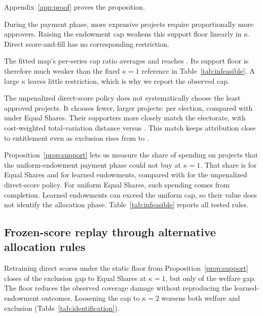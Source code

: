 \documentclass{article}
\begin{document}
Appendix~\ref{app:proof} proves the proposition.

During the payment phase, more expensive projects require proportionally more
approvers. Raising the endowment cap weakens this support floor linearly in
$\kappa$. Direct score-and-fill has no corresponding restriction.

The fitted map's per-series cap ratio averages \KappaEndowMean{} and reaches
\KappaEndowMax{}. Its support floor is therefore much weaker than the fixed
$\kappa = 1$ reference in Table~\ref{tab:infeasible}. A large $\kappa$ leaves
little restriction, which is why we report the observed cap.

The unpenalized direct-score policy does not systematically choose the least
approved projects. It chooses fewer, larger projects:
\CompOutcomeCornerFunded{} per election, compared with \CompMESFunded{} under
Equal Shares. Their supporters more closely match the electorate, with
cost-weighted total-variation distance \CompOutcomeCornerRepTV{} versus
\CompMESRepTV{}. This match keeps attribution close to entitlement even as
exclusion rises from \TestMESExcl{} to \LearnedCornerExcl{}.

Proposition~\ref{prop:support} lets us measure the share of spending on projects
that the uniform-endowment payment phase could not buy at $\kappa = 1$. That share is
\InfeasMESBudget{} for Equal Shares and \InfeasLearnedEndowBudget{} for learned
endowments, compared with \InfeasOutcomeCornerBudget{} for the unpenalized
direct-score policy. For uniform Equal Shares, such spending comes from
completion. Learned endowments can exceed the uniform cap, so their value does
not identify the allocation phase. Table~\ref{tab:infeasible} reports all tested rules.

\subsection{Frozen-score replay through alternative allocation rules}
\label{sec:identification}

Retraining direct scores under the static floor from
Proposition~\ref{prop:support} closes \FloorClosesExclPct{} of the exclusion gap
to Equal Shares at $\kappa=1$, but only \FloorClosesWelfarePct{} of the welfare
gap. The floor reduces the observed coverage damage without reproducing the
learned-endowment outcomes. Loosening the cap to $\kappa=2$ worsens both welfare
and exclusion (Table~\ref{tab:identification}).
\end{document}
